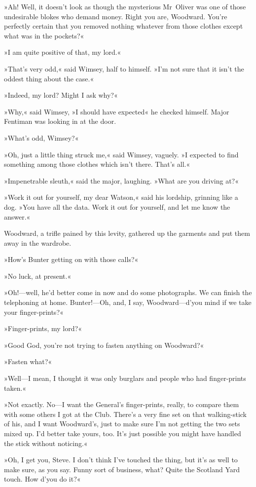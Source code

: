 »Ah! Well, it doesn't look as though the mysterious Mr~Oliver was one of those undesirable blokes who demand money. Right you are, Woodward. You're perfectly certain that you removed nothing whatever from those clothes except what was in the pockets?«

»I am quite positive of that, my lord.«

»That's very odd,« said Wimsey, half to himself. »I'm not sure that it isn't the oddest thing about the case.«

»Indeed, my lord? Might I ask why?«

»Why,« said Wimsey, »I should have expected\longdash« he checked himself. Major Fentiman was looking in at the door.

»What's odd, Wimsey?«

»Oh, just a little thing struck me,« said Wimsey, vaguely. »I expected to find something among those clothes which isn't there. That's all.«

»Impenetrable sleuth,« said the major, laughing. »What are you driving at?«

»Work it out for yourself, my dear Watson,« said his lordship, grinning like a dog. »You have all the data. Work it out for yourself, and let me know the answer.«

Woodward, a trifle pained by this levity, gathered up the garments and put them away in the wardrobe.

»How's Bunter getting on with those calls?«

»No luck, at present.«

»Oh!—well, he'd better come in now and do some photographs. We can finish the telephoning at home. Bunter!—Oh, and, I say, Woodward—d'you mind if we take your finger-prints?«

»Finger-prints, my lord?«

»Good God, you're not trying to fasten anything on Woodward?«

»Fasten what?«

»Well—I mean, I thought it was only burglars and people who had finger-prints taken.«

»Not exactly. No—I want the General's finger-prints, really, to compare them with some others I got at the Club. There's a very fine set on that walking-stick of his, and I want Woodward's, just to make sure I'm not getting the two sets mixed up. I'd better take yours, too. It's just possible you might have handled the stick without noticing.«

»Oh, I get you, Steve. I don't think I've touched the thing, but it's as well to make sure, as you say. Funny sort of business, what? Quite the Scotland Yard touch. How d'you do it?«


